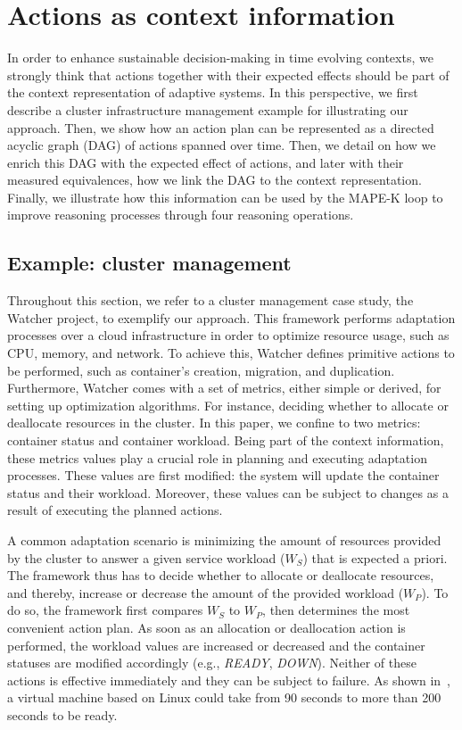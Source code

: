 \section{Actions as context information}
\label{sec:contribution}
In order to enhance sustainable decision-making in time evolving contexts, we strongly think that actions together with their expected effects should be part of the context representation of adaptive systems.
In this perspective, we first describe a cluster infrastructure management example for illustrating our approach.
Then, we show how an action plan can be represented as a directed acyclic graph (DAG) of actions spanned over time.
Then, we detail on how we enrich this DAG with the expected effect of actions, and later with their measured equivalences, \ie how we link the DAG to the context representation.
Finally, we illustrate how this information can be used by the MAPE-K loop to improve reasoning processes through four reasoning operations.

\subsection{Example: cluster management}
Throughout this section, we refer to a cluster management case study, the Watcher project, to exemplify our approach.
This framework performs adaptation processes over a cloud infrastructure in order to optimize resource usage, such as CPU, memory, and network. 
To achieve this, Watcher defines primitive actions to be performed, such as container's creation, migration, and duplication.
Furthermore, Watcher comes with a set of metrics, either simple or derived, for setting up optimization algorithms.
For instance, deciding whether to allocate or deallocate resources in the cluster.
In this paper, we confine to two metrics: container status and container workload.
Being part of the context information, these metrics values play a crucial role in planning and executing adaptation processes.  
These values are first modified: the system will update the container  status and their workload.
Moreover, these values can be subject to changes as a result of executing the planned actions. 

A common adaptation scenario is minimizing the amount of resources provided by
the cluster to answer a given service workload ($W_S$) that is expected a priori.
The framework thus has to decide whether to allocate or deallocate resources, and thereby, increase or decrease the amount of the provided workload ($W_P$). 
To do so, the framework first compares $W_S$ to $W_P$, then determines the most convenient action plan. 
As soon as an allocation or deallocation action is performed, the workload values are increased or decreased and the container statuses are modified accordingly (e.g., \textit{READY}, \textit{DOWN}).
Neither of these actions is effective immediately and they can be subject to failure.
As shown in~\cite{DBLP:conf/IEEEcloud/MaoH12}, a virtual machine based on Linux could take from 90 seconds to more than 200 seconds to be ready. 



